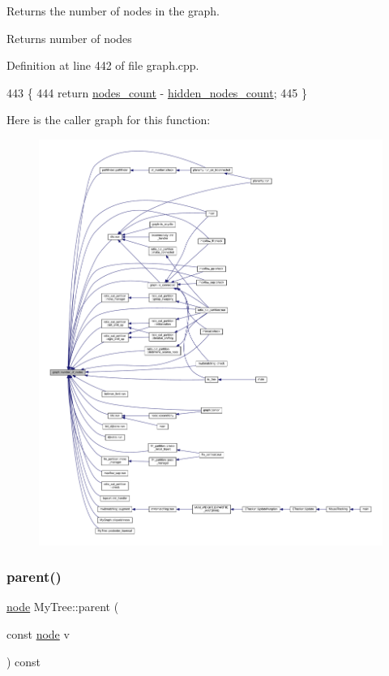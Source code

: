 Returns the number of nodes in the graph.

\begin{DoxyReturn}{Returns}
number of nodes 
\end{DoxyReturn}


Definition at line 442 of file graph.\+cpp.


\begin{DoxyCode}
443 \{
444     \textcolor{keywordflow}{return} \mbox{\hyperlink{classgraph_a1f59223d0bcf647920963d7a661dd74a}{nodes\_count}} - \mbox{\hyperlink{classgraph_aa72548d972d226a69f7f8fb92b363860}{hidden\_nodes\_count}};
445 \}
\end{DoxyCode}
Here is the caller graph for this function\+:
\nopagebreak
\begin{figure}[H]
\begin{center}
\leavevmode
\includegraphics[width=350pt]{classgraph_a42c78e0a9f115655e3ff0efe35ebfc4e_icgraph}
\end{center}
\end{figure}
\mbox{\label{class_my_tree_a6dd1940094f32e411a4107c01a6997fb}} 
\subsubsection{\texorpdfstring{parent()}{parent()}}
{\footnotesize\ttfamily \mbox{\hyperlink{classnode}{node}} My\+Tree\+::parent (\begin{DoxyParamCaption}\item[{const \mbox{\hyperlink{classnode}{node}}}]{v }\end{DoxyParamCaption}) const}



